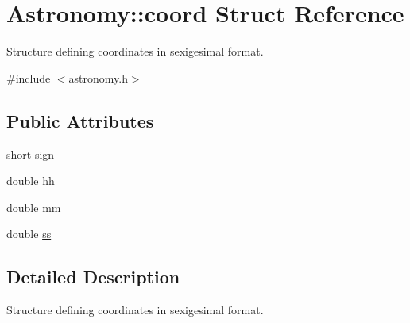 \hypertarget{struct_astronomy_1_1coord}{\section{Astronomy\-:\-:coord Struct Reference}
\label{struct_astronomy_1_1coord}
}


Structure defining coordinates in sexigesimal format.  




{\ttfamily \#include $<$astronomy.\-h$>$}

\subsection*{Public Attributes}
\begin{DoxyCompactItemize}
\item 
short \hyperlink{struct_astronomy_1_1coord_a6eb7cb493d4a55ef75f6297f12e19fa6}{sign}
\item 
double \hyperlink{struct_astronomy_1_1coord_a88e90750b0c24f523003b7a85078ea11}{hh}
\item 
double \hyperlink{struct_astronomy_1_1coord_ac3e70ee54e58ae0f61fc5f0612d5bbcc}{mm}
\item 
double \hyperlink{struct_astronomy_1_1coord_a1d385ad7c94b73fd827a9b647530b228}{ss}
\end{DoxyCompactItemize}


\subsection{Detailed Description}
Structure defining coordinates in sexigesimal format. 

